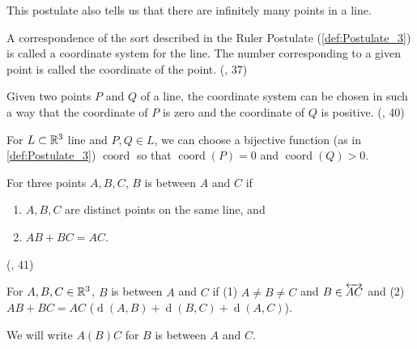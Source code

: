   This postulate also tells us that there are infinitely many points in a line.


\begin{definition}\label{def:Coordinate}
  \leanok
  A correspondence of the sort described in the Ruler Postulate (\ref{def:Postulate_3}) is called a coordinate system
  for the line.
  The number corresponding to a given point is called the coordinate of the point.
  (\cite{SMSGGeometry}, 37)


\end{definition}

\begin{definition}\label{def:Postulate_4}
  Given two points $P$ and $Q$ of a line, the coordinate system can be chosen in such a way that the coordinate of $P$ is zero and the coordinate of $Q$ is positive.
  (\cite{SMSGGeometry}, 40)


  For $L \subset \mathbb{R}^3$ line and $P,Q \in L$, we can choose a bijective function (as in \ref{def:Postulate_3}) $\operatorname{coord}$ so that $\operatorname{coord}(P)=0$ and $\operatorname{coord}(Q)>0$.
\end{definition}

\begin{definition}[Betweenness]\label{def:Betweenness}
  \leanok
  For three points $A,B,C$, $B$ is between $A$ and $C$ if
  \begin{enumerate}
    \item $A,B,C$ are distinct points on the same line, and
    \item $AB + BC =AC$.
  \end{enumerate}
  (\cite{SMSGGeometry}, 41)

  For $A,B,C \in \mathbb{R}^3$, $B$ is between $A$ and $C$ if (1) $A\ne B\ne C$ and $B \in \overleftrightarrow{AC}$ and (2) $AB+BC=AC$ ($\operatorname{d}(A,B)+\operatorname{d}(B,C)+\operatorname{d}(A,C)$).

  We will write $A(B)C$ for $B$ is between $A$ and $C$.
\end{definition}

